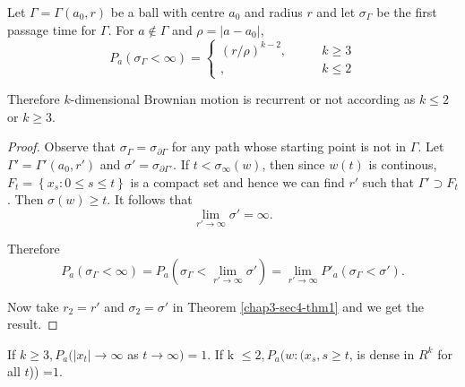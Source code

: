 \begin{thm}\label{chap3-sec4-thm2}%
Let $\Gamma = \Gamma (a_0, r)$ be a ball with centre $a_0$ and
radius $r$ and let $\sigma_\Gamma$ be the first passage time for
$\Gamma$. For $a \notin \Gamma$ and $\rho = |a-a_0|$,\pageoriginale 
  \begin{equation*}
    P_a (\sigma_\Gamma < \infty)=
    \begin{cases}
      (r / \rho)^{k-2}, \qquad  &  k \geq 3 \\
      ,& k \leq 2
    \end{cases}
  \end{equation*}

  Therefore $k$-dimensional Brownian motion is recurrent or not
  according as $k \leq 2$ or $k \geq 3$. 
\end{thm}

\begin{proof}
  Observe that $\sigma_\Gamma = \sigma_{\partial \Gamma}$ for any path
  whose starting point is not in $\Gamma$. Let $\Gamma' = \Gamma'(a_0,
  r')$ and $\sigma' = \sigma_{\partial \Gamma'}$. If $t < \sigma_
  \infty(w)$, then since $w(t)$ is continous, $F_t = \left\{ x_s : 0
  \leq s \leq t \right \}$ is a compact set and hence we can find $r'$
  such that $\Gamma' \supset F_t$. Then $\sigma (w) \geq t$. It
  follows that 
  $$
  \lim_{r' \to \infty} \sigma'  =\infty.
  $$

  Therefore
  $$
  P_a (\sigma_\Gamma < \infty) = P_a (\sigma_\Gamma < \lim_{r' \to
    \infty} \sigma') = \lim_{r' \to \infty} P'_a (\sigma_\Gamma <
  \sigma'). 
  $$

  Now take $r_2 = r'$ and $\sigma_2 = \sigma'$ in Theorem
  \ref{chap3-sec4-thm1} and we get the result. 
\end{proof}

\begin{thm}\label{chap3-sec4-thm3}%
  If $k \geq 3, P_a (| x_t | \to \infty$ as $t \to \infty) = 1$. If k
  $\leq 2, P_a(w : (x_s, s \geq t$, is dense in $R^k$ for all $t$))
  =$1$. 
\end{thm}

